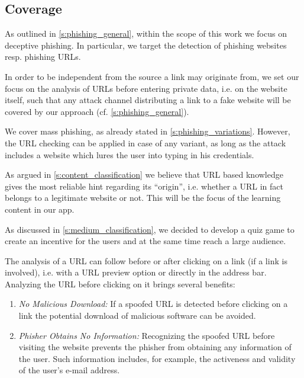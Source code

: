 \subsection{Coverage}
\label{s:coverage}
\begin{description}[leftmargin=0cm]
	\item[Deceptive Phishing as Phishing Technique:] As outlined in \autoref{s:phishing_general}, within the scope of this work we focus on deceptive phishing.
 In particular, we target the detection of phishing websites resp. phishing URLs.

	\item[Several Attack Channels:] In order to be independent from the source a link may originate from, we set our focus on the analysis of URLs before entering private data, i.e. on the website itself, such that any attack channel distributing a link to a fake website will be covered by our approach (cf. \autoref{s:phishing_general}).

	\item[Mass Phishing as Variation of Phishing:] We cover mass phishing, as already stated in \autoref{s:phishing_variations}.
 However, the URL checking can be applied in case of any variant, as long as the attack includes a website which lures the user into typing in his credentials.

	\item[URL Based Knowledge as Learning Content:] As argued in \autoref{s:content_classification} we believe that URL based knowledge gives the most reliable hint regarding its ``origin'', i.e. whether a URL in fact belongs to a legitimate website or not. This will be the focus of the learning content in our app.

	\item[Game and Quiz Based Learning as Communication Medium:] As discussed in \autoref{s:medium_classification}, we decided to develop a quiz game to create an incentive for the users and at the same time reach a large audience. 

	\item[After Click URL Analysis:] The analysis of a URL can follow before or after clicking on a link (if a link is involved), i.e. with a URL preview option or directly in the address bar. 
Analyzing the URL before clicking on it brings several benefits:

\begin{enumerate}
	\item \textit{No Malicious Download:} If a spoofed URL is detected before clicking on a link the potential download of  malicious software can be avoided. 
	\item \textit{Phisher Obtains No Information:} Recognizing the spoofed URL before visiting the website prevents the phisher from obtaining any information of the user. Such information includes, for example, the activeness and validity of the user's e-mail address. 
\end{enumerate}


\end{description}
